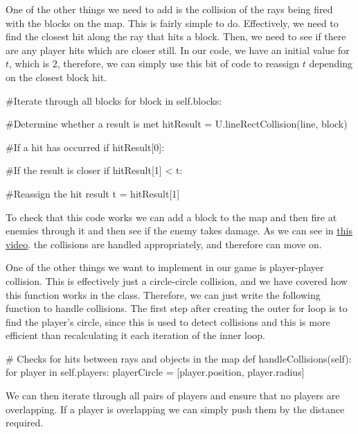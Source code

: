 \vs
One of the other things we need to add is the collision of the rays being fired with the blocks on the map. This is fairly simple to do. Effectively, we need to find the closest hit along the ray that hits a block. Then, we need to see if there are any player hits which are closer still. In our code, we have an initial value for $t$, which is 2, therefore, we can simply use this bit of code to reassign $t$ depending on the closest block hit.

\begin{mpy}
                #Iterate through all blocks
                for block in self.blocks:

                    #Determine whether a result is met
                    hitResult = U.lineRectCollision(line, block)

                    #If a hit has occurred
                    if hitResult[0]:

                        #If the result is closer
                        if hitResult[1] < t:

                            #Reassign the hit result
                            t = hitResult[1]
\end{mpy}

To check that this code works we can add a block to the map and then fire at enemies through it and then see if the enemy takes damage. As we can see in \href{https://youtu.be/6PZf1pQkwMM}{this video}. the collisions are handled appropriately, and therefore can move on.

\vs
One of the other things we want to implement in our game is player-player collision. This is effectively just a circle-circle collision, and we have covered how this function works in the  class. Therefore, we can just write the following function to handle collisions. The first step after creating the outer for loop is to find the player's circle, since this is used to detect collisions and this is more efficient than recalculating it each iteration of the inner loop.

\begin{mpy}
    # Checks for hits between rays and objects in the map
    def handleCollisions(self):
        for player in self.players:
            playerCircle = [player.position, player.radius]
\end{mpy}

We can then iterate through all pairs of players and ensure that no players are overlapping. If a player is overlapping we can simply push them by the distance required.

